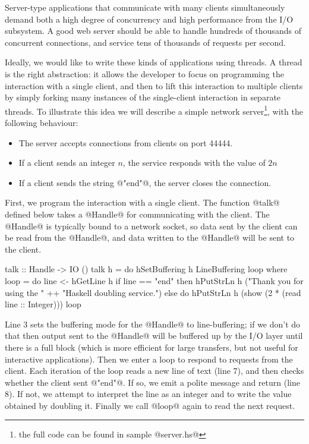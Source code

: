 
Server-type applications that communicate with many clients
simultaneously demand both a high degree of concurrency and high
performance from the I/O subsystem.  A good web server should be able
to handle hundreds of thousands of concurrent connections, and service
tens of thousands of requests per second.

Ideally, we would like to write these kinds of applications using
threads.  A thread is the right abstraction: it allows the developer
to focus on programming the interaction with a single client, and then
to lift this interaction to multiple clients by simply forking many
instances of the single-client interaction in separate threads.  To
illustrate this idea we will describe a simple network
server\footnote{the full code can be found in sample @server.hs@},
with the following behaviour:

\begin{itemize}
\item The server accepts connections from clients on port 44444.
\item If a client sends an integer $n$, the service responds with the value of
  $2n$
\item If a client sends the string @"end"@, the server closes the
  connection.
\end{itemize}

First, we program the interaction with a single client.  The function
@talk@ defined below takes a @Handle@ for communicating with the
client.  The @Handle@ is typically bound to a network socket, so data
sent by the client can be read from the @Handle@, and data written to
the @Handle@ will be sent to the client.

\begin{numhaskell}
talk :: Handle -> IO ()
talk h = do
  hSetBuffering h LineBuffering
  loop
 where
  loop = do
    line <- hGetLine h
    if line == "end"
       then hPutStrLn h ("Thank you for using the " ++
                         "Haskell doubling service.")
       else do hPutStrLn h (show (2 * (read line :: Integer)))
               loop
\end{numhaskell}

\noindent Line 3 sets the buffering mode for the @Handle@ to
line-buffering; if we don't do that then output sent to the @Handle@
will be buffered up by the I/O layer until there is a full block
(which is more efficient for large transfers, but not useful for
interactive applications).  Then we enter a loop to respond to
requests from the client.  Each iteration of the loop reads a new line
of text (line 7), and then checks whether the client sent @"end"@.  If
so, we emit a polite message and return (line 8).  If not, we attempt
to interpret the line as an integer and to write the value obtained by
doubling it.  Finally we call @loop@ again to read the next request.

